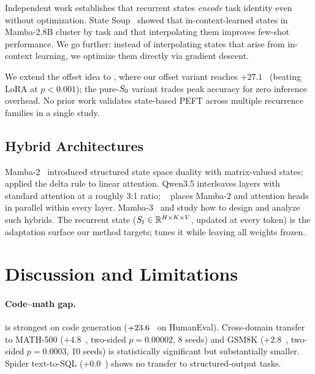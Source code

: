 \documentclass{article}
\begin{document}
Independent work establishes that recurrent states \emph{encode} task identity even without optimization.
State Soup~\cite{state_soup} showed that in-context-learned states in Mamba-2.8B cluster by task and that interpolating them improves few-shot performance.
We go further: instead of interpolating states that arise from in-context learning, we optimize them directly via gradient descent.

We extend the offset idea to \gdn, where our offset variant reaches $+27.1$~\pp{} (beating LoRA at $p < 0.001$); the pure-$S_0$ variant trades peak accuracy for zero inference overhead.
No prior work validates state-based PEFT across multiple recurrence families in a single study.

\subsection{Hybrid Architectures}
\label{sec:rel_hybrid}

Mamba-2~\cite{mamba2} introduced structured state space duality with matrix-valued states; \gdn~\cite{gated_deltanet} applied the delta rule to linear attention.
Qwen3.5 interleaves \gdn layers with standard attention at a roughly 3:1 ratio; \falcon~\cite{falconh1} places Mamba-2 and attention heads in parallel within every layer.
Mamba-3~\cite{mamba3} and \citet{hybrid_analysis} study how to design and analyze such hybrids.
The recurrent state ($S_t \in \mathbb{R}^{H \times K \times V}$, updated at every token) is the adaptation surface our method targets; \method tunes it while leaving all weights frozen.

\section{Discussion and Limitations}
\label{sec:discussion}

\paragraph{Code--math gap.}
\method is strongest on code generation ($+23.6$~\pp{} on HumanEval).
Cross-domain transfer to MATH-500 ($+4.8$~\pp, two-sided $p{=}0.00002$, 8
seeds) and GSM8K ($+2.8$~\pp, two-sided $p{=}0.0003$, 10 seeds) is
statistically significant but substantially smaller. Spider text-to-SQL
($+0.0$~\pp) shows no transfer to structured-output tasks.
\end{document}
